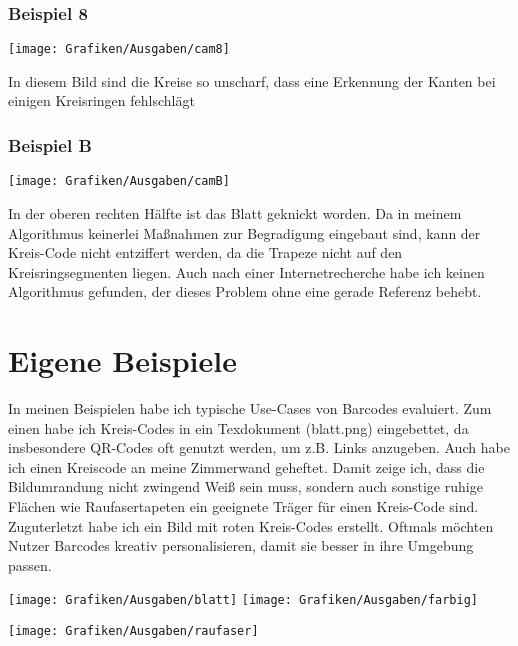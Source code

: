 \subsubsection{Beispiel 8}
\begin{minipage}{0.7\textwidth}
\texttt{[image: Grafiken/Ausgaben/cam8]}
\end{minipage}
\begin{minipage}{0.3\textwidth}
In diesem Bild sind die Kreise so unscharf, dass eine Erkennung der Kanten bei einigen Kreisringen fehlschlägt
\end{minipage}

\subsubsection{Beispiel B}
\begin{minipage}{0.7\textwidth}
\texttt{[image: Grafiken/Ausgaben/camB]}
\end{minipage}
\begin{minipage}{0.3\textwidth}
In der oberen rechten Hälfte ist das Blatt geknickt worden. Da in meinem Algorithmus keinerlei Maßnahmen zur Begradigung eingebaut sind, kann der Kreis-Code nicht entziffert werden, da die Trapeze nicht auf den Kreisringsegmenten liegen. Auch nach einer Internetrecherche habe ich keinen Algorithmus gefunden, der dieses Problem ohne eine gerade Referenz behebt.
\end{minipage}

\pagebreak
\section{Eigene Beispiele}
In meinen Beispielen habe ich typische Use-Cases von Barcodes evaluiert. Zum einen habe ich Kreis-Codes in ein Texdokument (blatt.png) eingebettet, da insbesondere QR-Codes oft genutzt werden, um z.B. Links anzugeben.
Auch habe ich einen Kreiscode an meine Zimmerwand geheftet. Damit zeige ich, dass die Bildumrandung nicht zwingend Weiß sein muss, sondern auch sonstige ruhige Flächen wie Raufasertapeten ein geeignete Träger für einen Kreis-Code sind.
Zuguterletzt habe ich ein Bild mit roten Kreis-Codes erstellt. Oftmals möchten Nutzer Barcodes kreativ personalisieren, damit sie besser in ihre Umgebung passen.

\begin{center}
\texttt{[image: Grafiken/Ausgaben/blatt]}
\hspace{1em}
\texttt{[image: Grafiken/Ausgaben/farbig]}
\end{center}
\begin{center}
\texttt{[image: Grafiken/Ausgaben/raufaser]}
\end{center}

